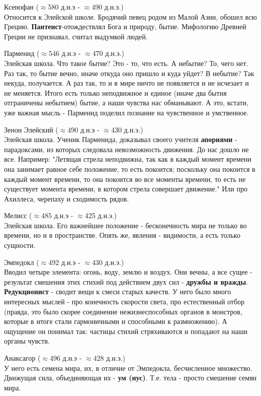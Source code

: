 \documentclass[12pt,a4paper]{article}
\begin{document}
Ксенофан ($\approx$580 д.н.э - $\approx$490 д.н.э.)\\ 
Относится к Элейской школе. Бродячий певец родом из Малой Азии, обошел всю Грецию. \textbf{Пантеист}-отождествлял Бога и природу, бытие. Мифологию Древней Греции не признавал, считал выдумкой людей.

Парменид ($\approx$546 д.н.э - $\approx$470 д.н.э.)\\
Элейская школа. Что такое бытие? Это - то, что есть. А небытие? То, чего нет. Раз так, то бытие вечно, иначе откуда оно пришло и куда уйдет? В небытие? Так некуда, получается. А раз так, то и в мире ничто не появляется и не исчезает и не меняется. Итого есть только неподвижное и единое (иначе два бытия отграничены небытием) бытие, а наши чувства нас обманывают. А это, кстати, уже важная мысль - Парменид поделил познание на чувственное и умственное. 

Зенон Элейский ($\approx$490 д.н.э - $\approx$430 д.н.э.)\\ 
Элейская школа. Ученик Парменида, доказывал своего учителя \textbf{апориями} - парадоксами, из которых следовала невозможность движения. До нас дошло не все. Например: "Летящая стрела неподвижна, так как в каждый момент времени она занимает равное себе положение, то есть покоится; поскольку она покоится в каждый момент времени, то она покоится во все моменты времени, то есть не существует момента времени, в котором стрела совершает движение." Или про Ахиллеса, черепаху и сходимость рядов.

Мелисс ($\approx$485 д.н.э - $\approx$425 д.н.э.)\\
Элейская школа. Его важнейшее положение - бесконечность мира не только во времени, но и в пространстве. Опять же, явления - видимости, а есть только сущности.

Эмпедокл ($\approx$492 д.н.э - $\approx$430 д.н.э.)\\
Вводил четыре элемента: огонь, воду, землю и воздух. Они вечны, а все сущее - результат смешения этих стихий под действием двух сил - \textbf{дружбы и вражды}. \textbf{Редукционист} - сводит вещи к смеси старых качеств. У него было много интересных мыслей - про конечность скорости света, про естественный отбор (правда, это было скорее соединение нежизнеспособных органов в монстров, которые в итоге стали гармоничными и способными к размножению). А ощущение он понимал так: частицы стихий стряхиваются и попадают на наши органы чувств.

Анаксагор ($\approx$496 д.н.э - $\approx$428 д.н.э.)\\
У него есть семена мира, их, в отличие от Эмпедокла, бесчисленное множество. Движущая сила, объединяющая их - \textbf{ум (нус)}. Т.е. тела - просто смешение семян мира.
\end{document}
